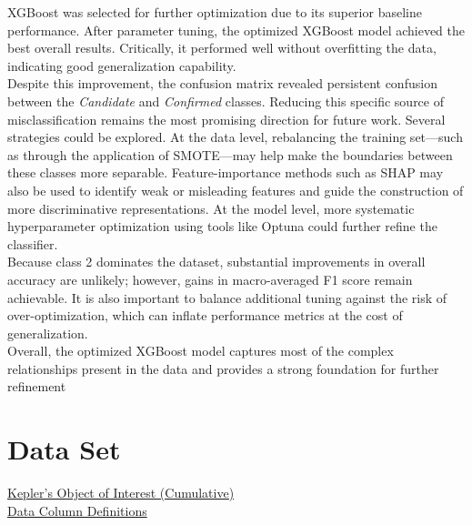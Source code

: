 \documentclass[10pt,twocolumn,letterpaper]{article}
\begin{document}
XGBoost was selected for further optimization due to its superior baseline performance. After parameter tuning, the optimized XGBoost model achieved the best overall results. Critically, it performed well without overfitting the data, indicating good generalization capability. \\

Despite this improvement, the confusion matrix revealed persistent confusion between the \textit{Candidate} and \textit{Confirmed} classes. Reducing this specific source of misclassification remains the most promising direction for future work. Several strategies could be explored. At the data level, rebalancing the training set—such as through the application of SMOTE—may help make the boundaries between these classes more separable. Feature-importance methods such as SHAP may also be used to identify weak or misleading features and guide the construction of more discriminative representations. At the model level, more systematic hyperparameter optimization using tools like Optuna could further refine the classifier.\\

Because class 2 dominates the dataset, substantial improvements in overall accuracy are unlikely; however, gains in macro-averaged F1 score remain achievable. It is also important to balance additional tuning against the risk of over-optimization, which can inflate performance metrics at the cost of generalization.\\

Overall, the optimized XGBoost model captures most of the complex relationships present in the data and provides a strong foundation for further refinement\\

\section*{Data Set}

\href{https://exoplanetarchive.ipac.caltech.edu/cgi-bin/TblView/nph-tblView?app=ExoTbls&config=cumulative}{Kepler's Object of Interest (Cumulative)} \\
\href{https://exoplanetarchive.ipac.caltech.edu/docs/API_kepcandidate_columns.html}{Data Column Definitions} 
\end{document}
